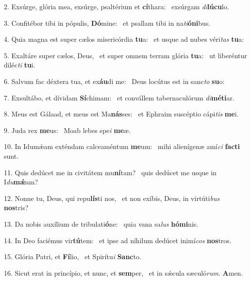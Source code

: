 2. Exsúrge, glória mea, exsúrge, psaltérium et \textbf{cí}thara: \ast\  exsúrgam \textit{di}\textbf{lú}\textbf{cu}lo.\

3. Confitébor tibi in pópulis, \textbf{Dó}mine: \ast\  et psallam tibi in na\textit{ti}\textbf{ó}\textbf{ni}bus.\

4. Quia magna est super cælos misericórdia \textbf{tu}a: \ast\  et usque ad nubes véri\textit{tas} \textbf{tu}a:\

5. Exaltáre super cælos, Deus, \dag\  et super omnem terram glória \textbf{tu}a: \ast\  ut liberéntur diléc\textit{ti} \textbf{tu}i.\

6. Salvum fac déxtera tua, et ex\textbf{áu}di me: \ast\  Deus locútus est in sanc\textit{to} \textbf{su}o:\

7. Exsultábo, et dívidam \textbf{Sí}chimam: \ast\  et convállem tabernaculórum \textit{di}\textbf{mé}\textbf{ti}ar.\

8. Meus est Gálaad, et meus est Ma\textbf{nás}ses: \ast\  et Ephraim suscéptio cápi\textit{tis} \textbf{me}i.\

9. Juda rex \textbf{me}us: \ast\  Moab lebes spe\textit{i} \textbf{me}æ.\

10. In Idumǽam exténdam calceaméntum \textbf{me}um: \ast\  mihi alienígenæ amí\textit{ci} \textbf{fac}\textbf{ti} sunt.\

11. Quis dedúcet me in civitátem mu\textbf{ní}tam? \ast\  quis dedúcet me usque in I\textit{du}\textbf{mǽ}am?\

12. Nonne tu, Deus, qui repu\textbf{lís}ti nos, \ast\  et non exíbis, Deus, in virtúti\textit{bus} \textbf{nos}tris?\

13. Da nobis auxílium de tribulati\textbf{ó}ne: \ast\  quia vana sa\textit{lus} \textbf{hó}\textbf{mi}nis.\

14. In Deo faciémus vir\textbf{tú}tem: \ast\  et ipse ad níhilum dedúcet inimí\textit{cos} \textbf{nos}tros.\

15. Glória Patri, et \textbf{Fí}lio, \ast\  et Spirítu\textit{i} \textbf{Sanc}to.\

16. Sicut erat in princípio, et nunc, et \textbf{sem}per, \ast\  et in sǽcula sæculó\textit{rum}. \textbf{A}men.\

